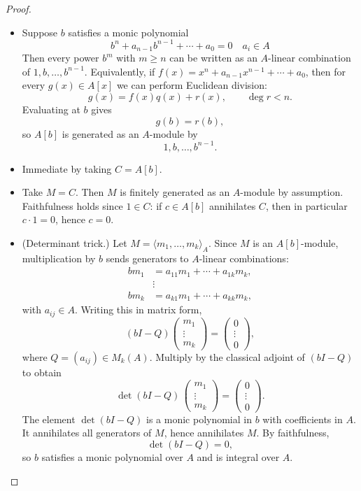 \documentclass[11pt,a4paper]{article}
\theoremstyle{definition}
\theoremstyle{plain}
\theoremstyle{remark}
\begin{document}
\begin{proof}
\begin{itemize}

\item[$(1)\Rightarrow(2)$]
Suppose $b$ satisfies a monic polynomial
\[
b^n + a_{n-1}b^{n-1} + \cdots + a_0 = 0
\quad a_i \in A
\]
Then every power $b^m$ with $m\ge n$ can be written as an $A$-linear
combination of $1,b,\dots,b^{n-1}$. Equivalently, if
$f(x)=x^n+a_{n-1}x^{n-1}+\cdots+a_0$, then for every $g(x)\in A[x]$
we can perform Euclidean division:
\[
g(x)=f(x)q(x)+r(x), \qquad \deg r < n.
\]
Evaluating at $b$ gives
\[
g(b)=r(b),
\]
so $A[b]$ is generated as an $A$-module by
\[
1,b,\dots,b^{n-1}.
\]

\item[$(2)\Rightarrow(3)$]
Immediate by taking $C=A[b]$.

\item[$(3)\Rightarrow(4)$]
Take $M=C$. Then $M$ is finitely generated as an $A$-module by
assumption. Faithfulness holds since $1\in C$: if
$c\in A[b]$ annihilates $C$, then in particular $c\cdot 1=0$, hence
$c=0$.

\item[$(4)\Rightarrow(1)$] (Determinant trick.)
Let $M=\langle m_1,\dots,m_k\rangle_A$. Since $M$ is an $A[b]$-module,
multiplication by $b$ sends generators to $A$-linear combinations:
\begin{align*}
b m_1 &= a_{11}m_1 + \cdots + a_{1k}m_k, \\
&\vdots \\
b m_k &= a_{k1}m_1 + \cdots + a_{kk}m_k,
\end{align*}
with $a_{ij}\in A$. Writing this in matrix form,
\[
(bI - Q)
\begin{pmatrix}
m_1\\ \vdots\\ m_k
\end{pmatrix}
=
\begin{pmatrix}
0\\ \vdots\\ 0
\end{pmatrix},
\]
where $Q=(a_{ij})\in M_k(A)$. Multiply by the classical adjoint of
$(bI-Q)$ to obtain
\[
\det(bI-Q)\,
\begin{pmatrix}
m_1\\ \vdots\\ m_k
\end{pmatrix}
=
\begin{pmatrix}
0\\ \vdots\\ 0
\end{pmatrix}.
\]
The element $\det(bI-Q)$ is a monic polynomial in $b$ with
coefficients in $A$. It annihilates all generators of $M$, hence
annihilates $M$. By faithfulness,
\[
\det(bI-Q)=0,
\]
so $b$ satisfies a monic polynomial over $A$ and is integral over $A$.

\end{itemize}
\end{proof}
\end{document}
